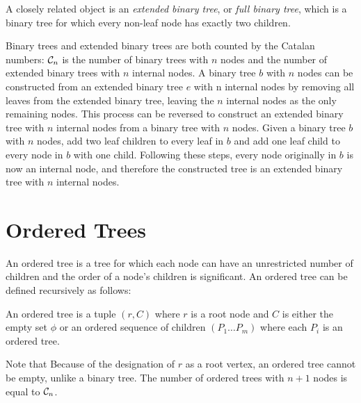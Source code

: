  A closely related object is an \emph{extended binary tree}, or \emph{full binary tree}, which is a binary tree for which every non-leaf node has exactly two children.  

Binary trees and extended binary trees are both counted by the Catalan numbers: $\mathcal{C}_n$ is the number of binary trees with $n$ nodes and the number of extended binary trees with $n$ internal nodes.  
A binary tree $b$ with $n$ nodes can be constructed from an extended binary tree $e$ with n internal nodes by removing all leaves from the extended binary tree, leaving the $n$ internal nodes as the only remaining nodes.
This process can be reversed to construct an extended binary tree with $n$ internal nodes from a binary tree with $n$ nodes. Given a binary tree $b$ with $n$ nodes, add two leaf children to every leaf in $b$ and add one leaf child to every node in $b$ with one child. Following these steps, every node originally in $b$ is now an internal node, and therefore the constructed tree is an extended binary tree with $n$ internal nodes.

\section{Ordered Trees} \label{sec:otrees}

An ordered tree is a tree for which each node can have an unrestricted number of children and the order of a node's children is significant.  An ordered tree can be defined recursively as follows:


\begin{definition}
An ordered tree is a tuple $(r,C)$ where $r$ is a root node and $C$ is either the empty set $\phi$ or an ordered sequence of children $(P_1\dots P_m)$ where each $P_i$ is an ordered tree.  
\end{definition}
Note that Because of the designation of $r$ as a root vertex, an ordered tree cannot be empty, unlike a binary tree.  The number of ordered trees with $n+1$ nodes is equal to $\mathcal{C}_n$.

